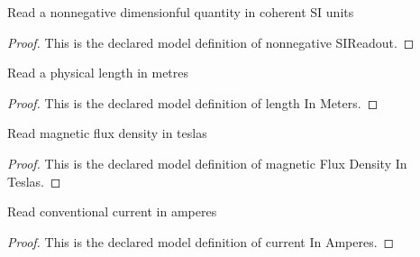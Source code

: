 \begin{definition}
  \label{def:physics:phyx-mini-0949:phyxminiproblems-problemphyxmini0949-nonnegativesireadout}
  Read a nonnegative dimensionful quantity in coherent SI units
\end{definition}
\begin{proof}
  This is the declared model definition of nonnegative SIReadout.
\end{proof}
\begin{definition}
  \label{def:physics:phyx-mini-0949:phyxminiproblems-problemphyxmini0949-lengthinmeters}
  Read a physical length in metres
\end{definition}
\begin{proof}
  This is the declared model definition of length In Meters.
\end{proof}
\begin{definition}
  \label{def:physics:phyx-mini-0949:phyxminiproblems-problemphyxmini0949-magneticfluxdensityinteslas}
  Read magnetic flux density in teslas
\end{definition}
\begin{proof}
  This is the declared model definition of magnetic Flux Density In Teslas.
\end{proof}
\begin{definition}
  \label{def:physics:phyx-mini-0949:phyxminiproblems-problemphyxmini0949-currentinamperes}
  Read conventional current in amperes
\end{definition}
\begin{proof}
  This is the declared model definition of current In Amperes.
\end{proof}
